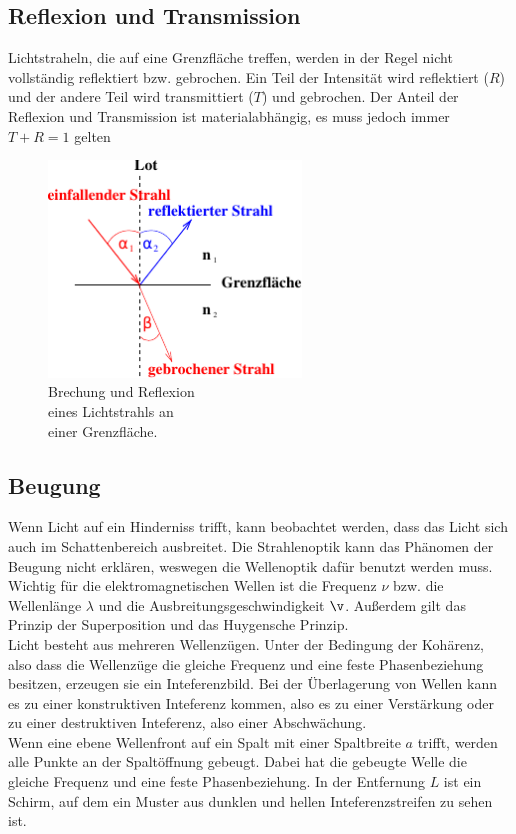 \subsection{Reflexion und Transmission}
\label{subsec:R+T}
\begin{minipage}[t]{0,5\textwidth}
    Lichtstraheln, die auf eine Grenzfläche treffen, werden in der Regel nicht vollständig reflektiert bzw. gebrochen.
    Ein Teil der Intensität wird reflektiert ($R$) und der andere Teil wird transmittiert ($T$) und gebrochen.
    Der Anteil der Reflexion und Transmission ist materialabhängig, es muss jedoch immer $T + R = 1$ gelten
\end{minipage} 
\begin{minipage}[t]{0,5\textwidth}
    \begin{figure}[H]
        \centering
        \includegraphics[width=0.6\textwidth]{build/Abb_2c.pdf}
        \caption {Brechung und Reflexion\\eines Lichtstrahls an\\einer Grenzfläche\cite[2]{V400}.}
        \label{fig:Abb_1}
    \end{figure}

\end{minipage}   
\subsection{Beugung}
\label{subsec:Beugung}
Wenn Licht auf ein Hinderniss trifft, kann beobachtet werden, dass das Licht sich auch im Schattenbereich ausbreitet.
Die Strahlenoptik kann das Phänomen der Beugung nicht erklären, weswegen die Wellenoptik dafür benutzt werden muss.
Wichtig für die elektromagnetischen Wellen ist die Frequenz $\nu$ bzw. die Wellenlänge $\lambda$ und die Ausbreitungsgeschwindigkeit $\v$.
Außerdem gilt das Prinzip der Superposition und das Huygensche Prinzip.\\
Licht besteht aus mehreren Wellenzügen.
Unter der Bedingung der Kohärenz, also dass die Wellenzüge die gleiche Frequenz und eine feste Phasenbeziehung besitzen, erzeugen sie ein Inteferenzbild.
Bei der Überlagerung von Wellen kann es zu einer konstruktiven Inteferenz kommen, also es zu einer  Verstärkung oder zu einer destruktiven
Inteferenz, also einer Abschwächung.\\
Wenn eine ebene Wellenfront auf ein Spalt mit einer Spaltbreite $a$ trifft, werden alle Punkte an der Spaltöffnung gebeugt.
Dabei hat die gebeugte Welle die gleiche Frequenz und eine feste Phasenbeziehung. 
In der Entfernung $L$ ist ein Schirm, auf dem ein Muster aus dunklen und hellen Inteferenzstreifen zu sehen ist.


